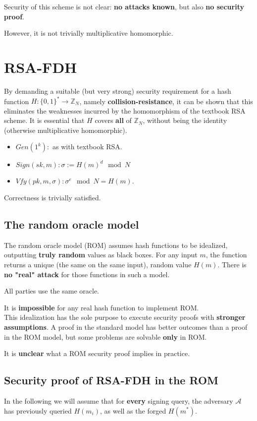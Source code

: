 \documentclass[oneside]{book}
\newcommand{\Z}[0]{\mathbb{Z}}
\newcommand{\cA}[0]{\mathcal{A}}
\begin{document}
Security of this scheme is not clear: \textbf{no attacks known}, but also \textbf{no security proof}.

However, it is not trivially multiplicative homomorphic.

\section{RSA-FDH}
By demanding a suitable (but very strong) security requirement for a hash function $H: \{0,1\}^* \rightarrow \Z_N$, namely \textbf{collision-resistance}, it can be shown that this eliminates the weaknesses incurred by the homomorphism of the textbook RSA scheme.
It is essential that $H$ covers \textbf{all} of $\Z_N$, without being the identity (otherwise multiplicative homomorphic).
\begin{itemize}
    \item $Gen(1^k): $ as with textbook RSA.
    \item $Sign(sk, m): \sigma := H(m)^d \mod N$
    \item $Vfy(pk, m, \sigma): \sigma^e \mod N = H(m)$.
\end{itemize}

Correctness is trivially satisfied.

\subsection{The random oracle model}
The random oracle model (ROM) assumes hash functions to be idealized, outputting \textbf{truly random} values as black boxes. For any input $m$, the function returns a unique (the same on the same input), random value $H(m)$.
There is \textbf{no "real" attack} for those functions in such a model.

All parties use the same oracle.

It is \textbf{impossible} for any real hash function to implement ROM.\\

This idealization has the sole purpose to execute security proofs with \textbf{stronger assumptions}. A proof in the standard model has better outcomes than a proof in the ROM model, but some problems are solvable \textbf{only} in ROM.

It is \textbf{unclear} what a ROM security proof implies in practice.

\subsection{Security proof of RSA-FDH in the ROM}
In the following we will assume that for \textbf{every} signing query, the adversary $\cA$ has previously queried $H(m_i)$, as well as the forged $H(m^*)$.
\end{document}
